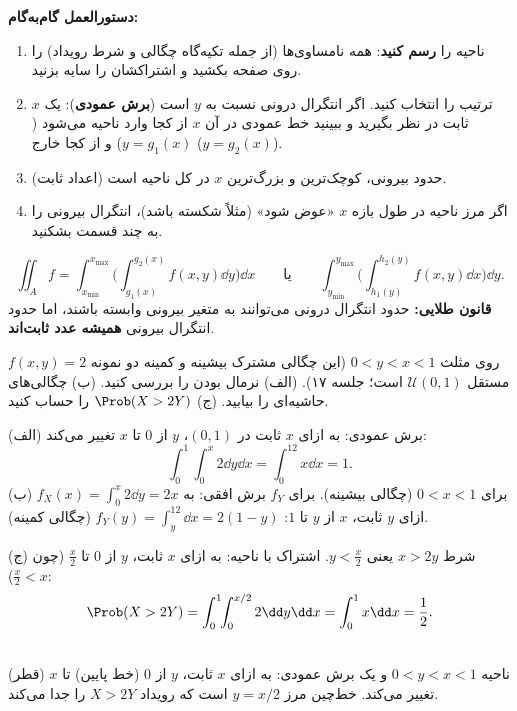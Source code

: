 \textbf{دستورالعمل گام‌به‌گام:}
\begin{enumerate}
\item ناحیه را \textbf{رسم کنید}: همه نامساوی‌ها (از جمله تکیه‌گاه چگالی و شرط رویداد) را روی صفحه بکشید و اشتراکشان را سایه بزنید.
\item ترتیب را انتخاب کنید. اگر انتگرال درونی نسبت به $y$ است (\textbf{برش عمودی}): یک $x$ ثابت در نظر بگیرید و ببینید خط عمودی در آن $x$ از کجا وارد ناحیه می‌شود ($y=g_1(x)$) و از کجا خارج ($y=g_2(x)$).
\item حدود بیرونی، کوچک‌ترین و بزرگ‌ترین $x$ در کل ناحیه است (اعداد ثابت).
\item اگر مرز ناحیه در طول بازه $x$ «عوض شود» (مثلاً شکسته باشد)، انتگرال بیرونی را به چند قسمت بشکنید.
\end{enumerate}
\[
\iint_Af=\int_{x_{\min}}^{x_{\max}}\Big(\int_{g_1(x)}^{g_2(x)}f(x,y)\dd y\Big)\dd x
\qquad\text{یا}\qquad
\int_{y_{\min}}^{y_{\max}}\Big(\int_{h_1(y)}^{h_2(y)}f(x,y)\dd x\Big)\dd y .
\]
\textbf{قانون طلایی:} حدود انتگرال درونی می‌توانند به متغیر بیرونی وابسته باشند، اما حدود انتگرال بیرونی \textbf{همیشه عدد ثابت‌اند}.

\begin{example}
$f(x,y)=2$ روی مثلث $0<y<x<1$ (این چگالی مشترک بیشینه و کمینه دو نمونه مستقل $\mathcal U(0,1)$ است؛ جلسه ۱۷). (الف) نرمال بودن را بررسی کنید. (ب) چگالی‌های حاشیه‌ای را بیابید. (ج) $\Prob(X>2Y)$ را حساب کنید.
\begin{solution}
(الف) برش عمودی: به ازای $x$ ثابت در $(0,1)$، $y$ از $0$ تا $x$ تغییر می‌کند:
\[
\int_0^1\!\!\int_0^x2\dd y\dd x=\int_0^12x\dd x=1 .
\]
(ب) $f_X(x)=\int_0^x2\dd y=2x$ برای $0<x<1$ (چگالی بیشینه). برای $f_Y$ برش افقی: به ازای $y$ ثابت، $x$ از $y$ تا $1$: $f_Y(y)=\int_y^12\dd x=2(1-y)$ (چگالی کمینه).

(ج) شرط $x>2y$ یعنی $y<\frac x2$. اشتراک با ناحیه: به ازای $x$ ثابت، $y$ از $0$ تا $\frac x2$ (چون $\frac x2<x$):
\[
\Prob(X>2Y)=\int_0^1\!\!\int_0^{x/2}2\dd y\dd x=\int_0^1x\dd x=\frac12 .
\]
\end{solution}
\end{example}

\begin{center}
\begin{tikzpicture}
\end{tikzpicture}\\
{\small ناحیه $0<y<x<1$ و یک برش عمودی: به ازای $x$ ثابت، $y$ از $0$ (خط پایین) تا $x$ (قطر) تغییر می‌کند. خط‌چین مرز $y=x/2$ است که رویداد $X>2Y$ را جدا می‌کند.}
\end{center}

